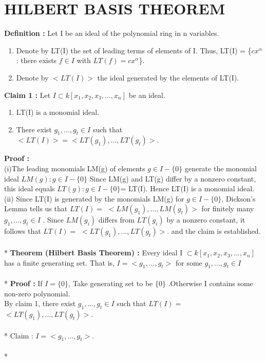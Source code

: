 \documentclass[12pt]{article}
\begin{document}
\section{HILBERT BASIS THEOREM}
{\bf Definition :} Let I be an ideal of the polynomial ring in n variables.\\
\begin{enumerate}
\item Denote by LT(I) the set of leading terms of elements of I. Thus, LT(I) = \{$cx^{\alpha}$ : there exists $f \in I$ with $LT(f) = cx^{\alpha}$\}.
\item Denote by $<LT(I)>$  the ideal generated by the elements of LT(I).
\end{enumerate}
{\bf Claim 1 :} Let $I \subset k[x_{1},x_{2},x_{3},...,x_{n}]$ be an ideal. 
\begin{enumerate}
\item LT(I) is a monomial ideal. 
\item There exist $g_{1},...,g_{t} \in I$ such that $<LT(I)> = <LT(g_{1}),... , LT(g_{t} )>$.
\end{enumerate}
{\bf Proof :} \\
(i)The leading monomials LM(g) of elements $g \in I-\{0\}$ generate the monomial ideal $LM(g) : g \in I - \{0\}$ 
Since LM(g) and LT(g) differ by a nonzero constant,\\
this ideal equals $LT(g): g \in I - \{0\}$= LT(I). Hence LT(I) is a monomial ideal.\\
(ii) Since LT(I) is generated by the monomials LM(g) for $g \in I - \{0\}$, Dickson’s Lemma  tells us that $LT(I) =$ $<LM(g_{1} ), . . . , LM(g_{t} )>$ for finitely many $g_{1} , . . . , g_{t} \in I$ . Since $LM(g_{i} )$ differs from $LT(g_{i} )$ by a nonzero constant, it follows that $LT(I) =$ $<LT(g_{1}),... , LT(g_{t} )>$. and the claim is established.\\\\*
{\bf Theorem (Hilbert Basis Theorem) :} Every ideal I $\subset  k[x_{1},x_{2},x_{3},...,x_{n}]$ has a finite generating set. That is, $I = <g_{1},...,g_{t}>$ for some $g_{1},...,g_{t} \in I$\\\\* 
{\bf Proof :} If $I = \{0\}$, Take generating set to be $\{0\}$ .Otherwise I contains some non-zero polynomial.\\
By claim 1, there exist $g_{1},...,g_{t} \in I$ such that $LT(I) =$ $<LT(g_{1}),... , LT(g_{t} )>$.\\\\*
Claim :  $I = <g_{1},...,g_{t}>$.\\\\*
\end{document}
